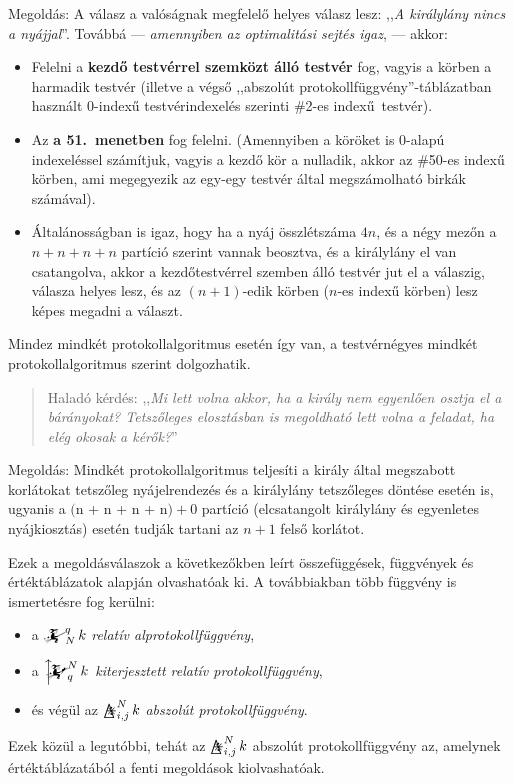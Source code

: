 \documentclass{article}
\newcommand{\eye}{\bigtriangleup\mspace{-14.607mu}\divideontimes}
\newcommand{\eyefun}[4]{\mathop{\eye}^{#1}_{#2,#3}#4}
\newcommand{\mainfun}[3]{\mathwitch_{#1}^{#2}#3}
\newcommand{\mainfunext}[3]{\left\uparrow\!\!\!\mathwitch*_{#2}^{#1}#3\right.}
\begin{document}
	Megoldás: A válasz a valóságnak megfelelő helyes válasz lesz: ,,\textit{A királylány nincs a nyájjal}''.
	Továbbá --- \emph{amennyiben az optimalitási sejtés igaz}, --- akkor:
	\begin{itemize}
		\item Felelni a \textbf{kezdő testvérrel szemközt álló testvér} fog, vagyis a körben a harmadik testvér (illetve a végső ,,abszolút protokollfüggvény''-táblázatban használt 0-indexű testvérindexelés szerinti \#2-es indexű~testvér).
		\item Az \textbf{a 51.~menetben} fog felelni. (Amennyiben a köröket is 0-alapú indexeléssel számítjuk, vagyis a kezdő kör a nulladik, akkor az \#50-es indexű körben, ami megegyezik az egy-egy testvér által megszámolható birkák számával).
		\item Általánosságban is igaz, hogy ha a nyáj összlétszáma $4n$, és a négy mezőn a $n + n + n + n$ partíció szerint vannak beosztva, és a királylány el van csatangolva, akkor a kezdőtestvérrel szemben álló testvér jut el a válaszig, válasza helyes lesz, és az $(n+1)$-edik körben ($n$-es indexű körben) lesz képes megadni a választ. 
	\end{itemize}

	Mindez mindkét protokollalgoritmus esetén így van, a testvérnégyes mindkét protokollalgoritmus szerint dolgozhatik.
	
	\begin{quotation}
		Haladó kérdés: ,,\textit{Mi lett volna akkor, ha a király nem egyenlően osztja el a bárányokat? Tetszőleges elosztásban is megoldható lett volna a feladat, ha elég okosak a kérők?}''
	\end{quotation}

	Megoldás: Mindkét protokollalgoritmus teljesíti a király által megszabott korlátokat tetszőleg nyájelrendezés és a királylány tetszőleges döntése esetén is, ugyanis a $($n + n + n + n$) + 0$ partíció (elcsatangolt királylány és egyenletes nyájkiosztás) esetén tudják tartani az $n+1$ felső korlátot.

	Ezek a megoldásválaszok a következőkben leírt összefüggések, függvények és értéktáblázatok alapján olvashatóak ki. A továbbiakban több függvény is ismertetésre fog kerülni:
	\begin{itemize}
		\item a $\mainfun Nqk$ \emph{relatív alprotokollfüggvény},
		\item a $\mainfunext Nqk$ \emph{kiterjesztett relatív protokollfüggvény},
		\item és végül az $\eyefun Nijk$ \emph{abszolút protokollfüggvény}.
	\end{itemize}
	Ezek közül a legutóbbi, tehát az  $\eyefun Nijk$ abszolút protokollfüggvény az, amelynek értéktáblázatából a fenti megoldások kiolvashatóak.
\end{document}
